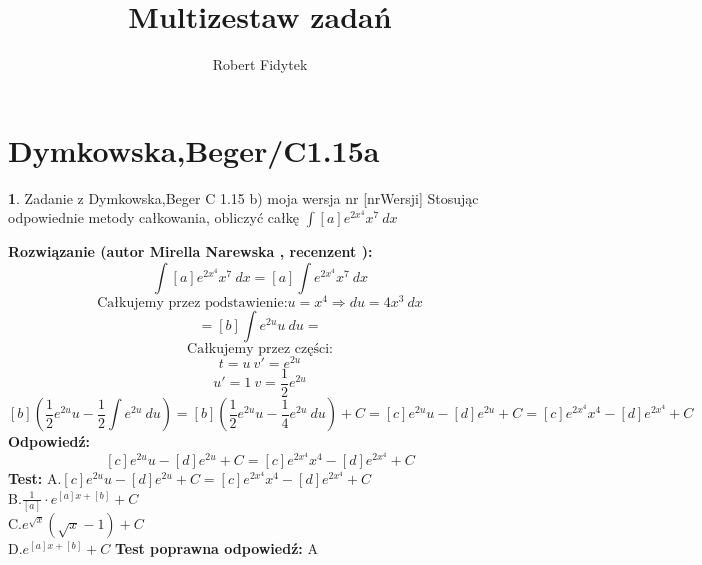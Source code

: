 \documentclass[12pt, a4paper]{article}
\title{Multizestaw zadań}
\author{Robert Fidytek}
\date{}
\theoremstyle{definition} %
\newtheorem{zad}{}
\newcommand{\kategoria}[1]{\section{#1}} %
\newcommand{\zadStart}[1]{\begin{zad}#1\newline} %
\newcommand{\zadStop}{\end{zad}}   %
\newcommand{\rozwStart}[2]{\noindent \textbf{Rozwiązanie (autor #1 , recenzent #2): }\newline} %
\newcommand{\odpStart}{\noindent \textbf{Odpowiedź:}\newline}    %
\newcommand{\odpStop}{\newline}                                             %
\newcommand{\testStart}{\noindent \textbf{Test:}\newline} %
\newcommand{\testStop}{\newline} %
\newcommand{\kluczStart}{\noindent \textbf{Test poprawna odpowiedź:}\newline} %
\newcommand{\kluczStop}{\newline} %
\begin{document}
\maketitle



\kategoria{Dymkowska,Beger/C1.15a}
\zadStart{Zadanie z Dymkowska,Beger C 1.15 b) moja wersja nr [nrWersji]}
Stosując odpowiednie metody całkowania, obliczyć całkę $\displaystyle \int [a]e^{2x^4}x^7 \ dx$
\zadStop
\rozwStart{Mirella Narewska}{}
$$\int [a]e^{2x^4}x^7 \ dx=[a]\int e^{2x^4}x^7 \ dx$$
$$\text{Całkujemy przez podstawienie:} u=x^4\Rightarrow du=4x^3 \ dx$$
$$=[b]\int e^{2u}u \ du=$$
$$\text{Całkujemy przez części:}$$
$$t=u \ v'=e^{2u}$$
$$u'=1 \ v=\frac{1}{2}e^{2u}$$
$$[b]\left( \frac{1}{2}e^{2u}u -\frac{1}{2}\int e^{2u} \ du\right)= [b]\left( \frac{1}{2}e^{2u}u  -\frac{1}{4}e^{2u}  \ du\right)+C=[c]e^{2u}u-[d]e^{2u} +C= [c]e^{2x^4}x^4-[d]e^{2x^4}+C$$
\odpStart
$$[c]e^{2u}u-[d]e^{2u} +C= [c]e^{2x^4}x^4-[d]e^{2x^4}+C$$
\odpStop
\testStart
A.$[c]e^{2u}u-[d]e^{2u} +C= [c]e^{2x^4}x^4-[d]e^{2x^4}+C$
\\
B.$\frac{1}{[a]}\cdot e^{[a]x+[b]}+C$
\\
C.$e^{\sqrt{x}}(\sqrt{x}-1)+C$
\\
D.$e^{[a]x+[b]}+C$
\testStop
\kluczStart
A
\kluczStop
\end{document}
